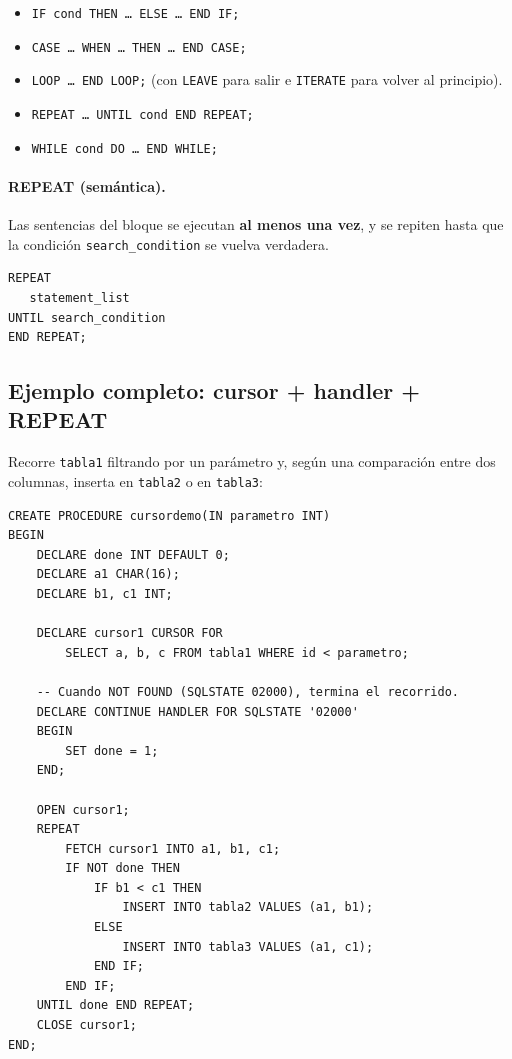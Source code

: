 \documentclass[11pt,a4paper]{article}
\begin{document}
\begin{itemize}
    \item \texttt{IF cond THEN \dots\ ELSE \dots\ END IF;}
    \item \texttt{CASE \dots\ WHEN \dots\ THEN \dots\ END CASE;}
    \item \texttt{LOOP \dots\ END LOOP;} (con \texttt{LEAVE} para
    salir e \texttt{ITERATE} para volver al principio).
    \item \texttt{REPEAT \dots\ UNTIL cond END REPEAT;}
    \item \texttt{WHILE cond DO \dots\ END WHILE;}
\end{itemize}

\paragraph{REPEAT (semántica).} Las sentencias del bloque se ejecutan
\textbf{al menos una vez}, y se repiten hasta que la condición
\texttt{search\_condition} se vuelva verdadera.

\begin{lstlisting}
REPEAT
   statement_list
UNTIL search_condition
END REPEAT;
\end{lstlisting}

\subsection{Ejemplo completo: cursor + handler + REPEAT}

Recorre \texttt{tabla1} filtrando por un parámetro y, según una
comparación entre dos columnas, inserta en \texttt{tabla2} o en
\texttt{tabla3}:

\begin{lstlisting}
CREATE PROCEDURE cursordemo(IN parametro INT)
BEGIN
    DECLARE done INT DEFAULT 0;
    DECLARE a1 CHAR(16);
    DECLARE b1, c1 INT;

    DECLARE cursor1 CURSOR FOR
        SELECT a, b, c FROM tabla1 WHERE id < parametro;

    -- Cuando NOT FOUND (SQLSTATE 02000), termina el recorrido.
    DECLARE CONTINUE HANDLER FOR SQLSTATE '02000'
    BEGIN
        SET done = 1;
    END;

    OPEN cursor1;
    REPEAT
        FETCH cursor1 INTO a1, b1, c1;
        IF NOT done THEN
            IF b1 < c1 THEN
                INSERT INTO tabla2 VALUES (a1, b1);
            ELSE
                INSERT INTO tabla3 VALUES (a1, c1);
            END IF;
        END IF;
    UNTIL done END REPEAT;
    CLOSE cursor1;
END;
\end{lstlisting}
\end{document}

